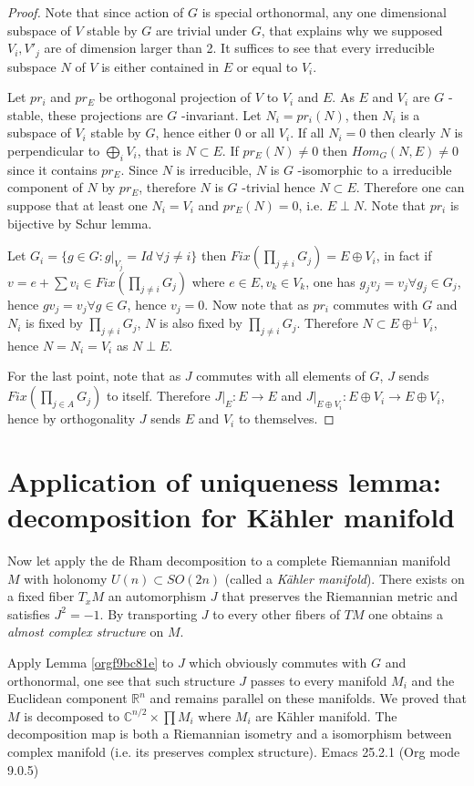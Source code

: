 \documentclass[11pt]{article}
\begin{document}
\begin{proof}
Note that since action of \(G\) is special orthonormal, any one dimensional subspace of \(V\) stable by
\(G\) are trivial under \(G\), that explains why we supposed \(V_i, V'_j\) are of dimension larger
than 2. It suffices to see that every irreducible subspace \(N\) of \(V\) is either contained in \(E\) or equal to
\(V_i\).

Let \(pr_i\) and \(pr_E\) be orthogonal projection of \(V\) to \(V_i\) and \(E\). As \(E\) and \(V_i\) are \(G\) -stable, these
projections are \(G\) -invariant. Let \(N_i = pr_i(N)\), then \(N_i\) is a subspace of \(V_i\) stable
by \(G\), hence either \(0\) or all \(V_i\). If all \(N_i=0\) then clearly \(N\) is perpendicular to \(\bigoplus_i
V_i\), that is \(N\subset E\). If \(pr_E(N)\ne 0\) then \(Hom_G(N, E) \ne 0\) since it contains \(pr_E\). Since
\(N\) is irreducible, \(N\) is \(G\) -isomorphic to a irreducible component of \(N\) by \(pr_E\), therefore
\(N\) is \(G\) -trivial hence \(N\subset E\). Therefore one can suppose that at least one \(N_i = V_i\) and
\(pr_E(N) = 0\), i.e. \(E\perp N\). Note that \(pr_i\) is bijective by Schur lemma.

Let \(G_i = \{g\in G: g|_{V_j} = Id\ \forall j\ne i \}\) then \(Fix(\prod_{j\ne i} G_j)= E\oplus V_i\), in fact if \(v = e +\sum v_i\in Fix(\prod_{j\ne i}
G_j)\) where \(e\in E, v_k\in V_k\), one has \(g_j v_j = v_j \forall g_j \in G_j\), hence \(g v_j = v_j
\forall g\in G\), hence \(v_j = 0\). Now note that as \(pr_i\) commutes with \(G\) and \(N_i\) is fixed by
\(\prod_{j\ne i}G_j\), \(N\) is also fixed by \(\prod_{j\ne i}G_j\). Therefore \(N\subset E \oplus^\perp
V_i\), hence \(N = N_i=V_i\) as \(N\perp E\).

For the last point, note that as \(J\) commutes with all elements of \(G\), \(J\) sends \(Fix(\prod_{j\in
A} G_j)\) to itself. Therefore \(J|_E: E\longrightarrow E\) and \(J|_{E\oplus V_i}: E\oplus
V_i\longrightarrow E\oplus V_i\), hence by orthogonality \(J\) sends \(E\) and \(V_i\) to themselves.
\end{proof}


\section{Application of uniqueness lemma: decomposition for Kähler manifold}
\label{sec:org83afeb1}
Now let apply the de Rham decomposition to a complete Riemannian manifold \(M\) with holonomy \(U(n)
\subset SO(2n)\) (called a \emph{Kähler manifold}). There exists on a fixed fiber \(T_xM\) an automorphism
\(J\) that preserves the Riemannian metric and satisfies \(J^2 = -1\). By transporting \(J\) to every other
fibers of \(TM\) one obtains a \emph{almost complex structure} on \(M\).

Apply Lemma \ref{orgf9bc81e} to \(J\) which obviously commutes with \(G\) and orthonormal, one
see that such structure \(J\) passes to every manifold \(M_i\) and the Euclidean component \(\mathbb{R}^n\) and
remains parallel on these manifolds. We proved that \(M\) is decomposed to \(\mathbb{C}^{n/2}\times
\prod M_i\) where \(M_i\) are Kähler manifold. The decomposition map is both a Riemannian isometry and
a isomorphism between complex manifold (i.e. its preserves complex structure). 
Emacs 25.2.1 (Org mode 9.0.5)
\end{document}

